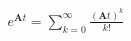 \documentclass[preview]{standalone}
\begin{document}
\begin{align*}
e^{\mathbf{A}t} = \sum_{k=0}^{\infty} \frac{(\mathbf{A}t)^k}{k!}
\end{align*}
\end{document}
